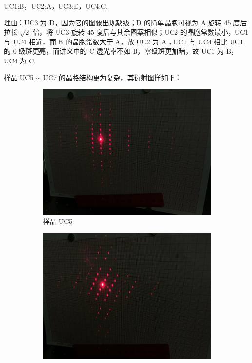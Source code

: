 \documentclass{customDoc}
\begin{document}
UC1:B，UC2:A，UC3:D，UC4:C.\newline


理由：UC3 为 D，因为它的图像出现缺级；D 的简单晶胞可视为 A 旋转 $45$ 度后拉长 $\sqrt{2}$ 倍，将 UC3 旋转 $45$ 度后与其余图案相似；UC2 的晶胞常数最小，UC1 与 UC4 相近，而 B 的晶胞常数大于 A，故 UC2 为 A；UC1 与 UC4 相比 UC1 的 0 级斑更亮，而讲义中的 C 透光率不如 B，零级斑更加暗，故 UC1 为 B，UC4 为 C.\newline


样品 UC5 $\sim$ UC7 的晶格结构更为复杂，其衍射图样如下：

\begin{figure}[H]
    \begin{subfigure}[b]{0.45\textwidth}
        \includegraphics[width=\textwidth]{UC5.jpg}
        \caption{样品 UC5}
        \label{fig:2D_5}
    \end{subfigure}
    \hfill
    \begin{subfigure}[b]{0.45\textwidth}
        \includegraphics[width=\textwidth]{UC6.jpg}

\end{subfigure}
\end{figure}
\end{document}
